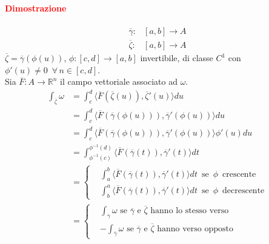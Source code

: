 \documentclass{article}
\newcommand{\R}{\mathbb{R}}
\begin{document}
\paragraph{\textcolor{red}{Dimostrazione}}
\begin{align*}
    \overline{\gamma}:& [a,b]\rightarrow A\\
    \overline{\zeta}:&[a,b]\rightarrow A
\end{align*}
$\overline{\zeta}=\overline{\gamma}(\phi(u))$, $\phi:[c,d]\rightarrow[a,b]$
invertibile, di classe $C^1$ con $\phi'(u)\neq 0 \,\,\, \forall \, n \in [c,d]$.\\
 Sia $\overline{F} : A \rightarrow \R^n$ il campo vettoriale associato ad $\omega$.
 \begin{align*}
     \int_{\overline{\zeta}} \omega& = \int_c^d \langle  \overline{F}(\overline{\zeta}(u)),\overline{\zeta}'(u) \rangle du \\
     & =\int_c^d \langle \overline{F}(\overline{\gamma}(\phi(u))), \overline{\gamma}' (\phi(u)) \rangle du\\
     &= \int_c^d \langle \overline{F}(\overline{\gamma}(\phi(u))),\overline{\gamma}'(\phi(u))\rangle \phi' (u)du\\
     &=\int_{\phi^{-1}(c)}^{\phi^{-1}(d)}\langle \overline{F}(\overline{\gamma}(t)), \overline{\gamma}'(t)\rangle dt\\
     &=\begin{cases}
       & \int_a^b \langle \overline{F}(\overline{\gamma}(t)), \overline{\gamma}'(t) \rangle dt\,\,\, \text{se}\,\,\, \phi \,\,\, \text{crescente}  \\
       & \int_b^a \langle \overline{F}(\overline{\gamma}(t)), \overline{\gamma}'(t) \rangle dt\,\,\, \text{se}\,\,\, \phi \,\,\, \text{decrescente}
     \end{cases}\\
     &=\begin{cases}
       &\int_{\overline{\gamma}}\omega \text{  se  } \overline{\gamma} \text{  e  }\overline{\zeta} \text{  hanno lo stesso verso}\\
        &-\int_{\overline{\gamma}}\omega \text{  se  } \overline{\gamma} \text{  e  } \overline{\zeta} \text{  hanno verso opposto}
     \end{cases}
 \end{align*}
 \begin{flushright}
     \Lightning
 \end{flushright}
\end{document}
